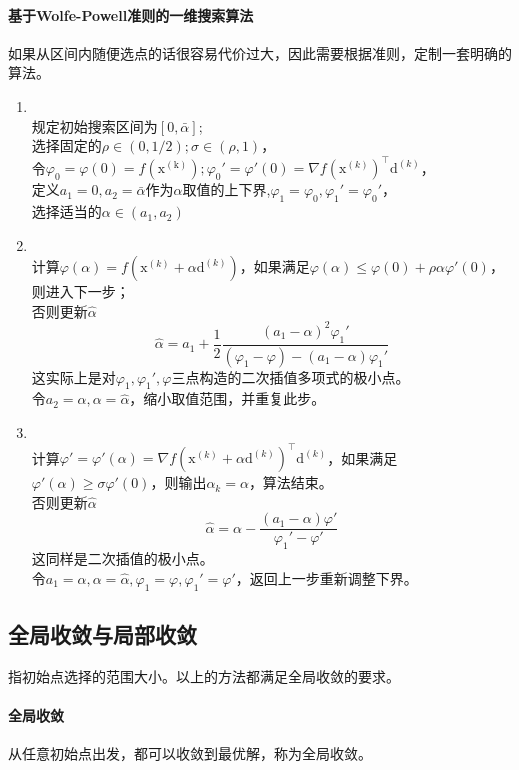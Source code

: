 \documentclass[a4paper]{D:/repositories/MyDGP/latex/PaperReadingLog}
\begin{document}
\paragraph{基于Wolfe-Powell准则的一维搜索算法}
如果从区间内随便选点的话很容易代价过大，因此需要根据准则，定制一套明确的算法。
\begin{enumerate}
    \item {}\\规定初始搜索区间为$[0,\bar{\alpha}]$;\\选择固定的$\rho\in(0,1/2);\sigma\in(\rho,1)$，\\令$\varphi_0=\varphi(0)=f(\mathrm{x^{(k)}});\varphi_0'=\varphi'(0)=\nabla f(\mathrm{x}^{(k)})^\top\mathrm{d}^{(k)}$，\\定义$a_1=0,a_2=\bar{\alpha}$作为$\alpha$取值的上下界,$\varphi_1=\varphi_0,\varphi_1'=\varphi_0'$，\\选择适当的$\alpha\in(a_1,a_2)$
    \item {}\\
    计算$\varphi(\alpha)=f(\mathrm{x}^{(k)}+\alpha\mathrm{d}^{(k)})$，如果满足$\varphi(\alpha)\le \varphi(0)+\rho\alpha\varphi'(0)$，则进入下一步；\\
    否则更新$\hat{\alpha}$
    $$
    \hat{\alpha}=a_1+\frac{1}{2}\frac{(a_1-\alpha)^2\varphi_1'}{(\varphi_1-\varphi)-(a_1-\alpha)\varphi_1'}
    $$
    这实际上是对$\varphi_1,\varphi_1',\varphi$三点构造的二次插值多项式的极小点。\\
    令$a_2=\alpha,\alpha=\hat{\alpha}$，缩小取值范围，并重复此步。
    \item {}\\
    计算$\varphi'=\varphi'(\alpha)=\nabla f(\mathrm{x}^{(k)}+\alpha\mathrm{d}^{(k)})^\top\mathrm{d}^{(k)}$，如果满足$\varphi'(\alpha)\ge\sigma\varphi'(0)$，则输出$\alpha_k=\alpha$，算法结束。\\
    否则更新$\hat{\alpha}$
    $$
    \hat{\alpha}=\alpha-\frac{(a_1-\alpha)\varphi'}{\varphi_1'-\varphi'}
    $$
    这同样是二次插值的极小点。\\
    令$a_1=\alpha,\alpha=\hat{\alpha},\varphi_1=\varphi,\varphi_1'=\varphi'$，返回上一步重新调整下界。
\end{enumerate}

\subsection{全局收敛与局部收敛}
指初始点选择的范围大小。以上的方法都满足全局收敛的要求。
\paragraph{全局收敛}从任意初始点出发，都可以收敛到最优解，称为全局收敛。
\end{document}
